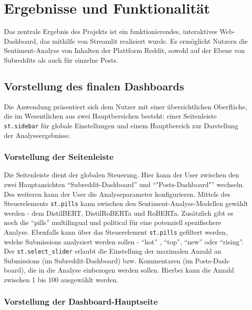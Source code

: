 \section{Ergebnisse und Funktionalität}

Das zentrale Ergebnis des Projekts ist ein funktionierendes, interaktives Web-Dashboard, das mithilfe von Streamlit realisiert wurde. Es ermöglicht Nutzern die Sentiment-Analyse von Inhalten der Plattform Reddit, sowohl auf der Ebene von Subreddits als auch für einzelne Posts.

\subsection{Vorstellung des finalen Dashboards}

Die Anwendung präsentiert sich dem Nutzer mit einer übersichtlichen Oberfläche, die im Wesentlichen aus zwei Hauptbereichen besteht: einer Seitenleiste \verb|st.sidebar| für globale Einstellungen und einem Hauptbereich zur Darstellung der Analyseergebnisse.

\subsubsection{Vorstellung der Seitenleiste}

Die Seitenleiste dient der globalen Steuerung. Hier kann der User zwischen den zwei Hauptansichten \enquote{Subreddit-Dashboard} und \enquote{"Posts-Dashboard"} wechseln. Des weiteren kann der User die Analyseparameter konfigurieren. Mittels des Steuerelements \newline
\verb|st.pills| kann zwischen den Sentiment-Analyse-Modellen gewählt werden - dem DistilBERT, DistilRoBERTa und RoBERTa. Zusätzlich gibt es noch die \enquote{pills} multilingual und political für eine potenziell spezifischere Analyse.
Ebenfalls kann über das Steuerelement \verb|st.pills| gefiltert werden, welche Submissions analysiert werden sollen - \enquote{hot} , \enquote{top}, \enquote{new} oder \enquote{rising}. Der \verb|st.select_slider| erlaubt die Einstellung der maximalen Anzahl an Submissions (im Subreddit-Dashboard) bzw. Kommentaren 
(im Posts-Dash-
\newline
board), die in die Analyse einbezogen werden sollen. Hierbei kann die Anzahl zwischen 1 bis 100 ausgewählt werden.

\subsubsection{Vorstellung der Dashboard-Hauptseite}

